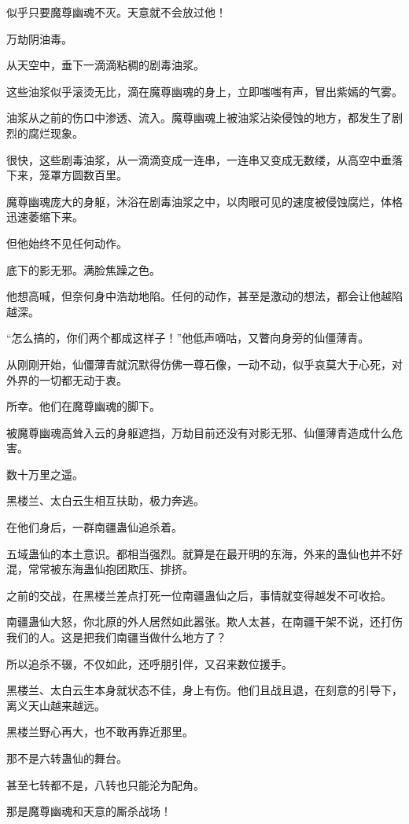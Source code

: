 \begin{this_body}
似乎只要魔尊幽魂不灭。天意就不会放过他！

万劫阴油毒。

从天空中，垂下一滴滴粘稠的剧毒油浆。

这些油浆似乎滚烫无比，滴在魔尊幽魂的身上，立即嗤嗤有声，冒出紫嫣的气雾。

油浆从之前的伤口中渗透、流入。魔尊幽魂上被油浆沾染侵蚀的地方，都发生了剧烈的腐烂现象。

很快，这些剧毒油浆，从一滴滴变成一连串，一连串又变成无数缕，从高空中垂落下来，笼罩方圆数百里。

魔尊幽魂庞大的身躯，沐浴在剧毒油浆之中，以肉眼可见的速度被侵蚀腐烂，体格迅速萎缩下来。

但他始终不见任何动作。

底下的影无邪。满脸焦躁之色。

他想高喊，但奈何身中浩劫地陷。任何的动作，甚至是激动的想法，都会让他越陷越深。

“怎么搞的，你们两个都成这样子！”他低声嘀咕，又瞥向身旁的仙僵薄青。

从刚刚开始，仙僵薄青就沉默得仿佛一尊石像，一动不动，似乎哀莫大于心死，对外界的一切都无动于衷。

所幸。他们在魔尊幽魂的脚下。

被魔尊幽魂高耸入云的身躯遮挡，万劫目前还没有对影无邪、仙僵薄青造成什么危害。

数十万里之遥。

黑楼兰、太白云生相互扶助，极力奔逃。

在他们身后，一群南疆蛊仙追杀着。

五域蛊仙的本土意识。都相当强烈。就算是在最开明的东海，外来的蛊仙也并不好混，常常被东海蛊仙抱团欺压、排挤。

之前的交战，在黑楼兰差点打死一位南疆蛊仙之后，事情就变得越发不可收拾。

南疆蛊仙大怒，你北原的外人居然如此嚣张。欺人太甚，在南疆干架不说，还打伤我们的人。这是把我们南疆当做什么地方了？

所以追杀不辍，不仅如此，还呼朋引伴，又召来数位援手。

黑楼兰、太白云生本身就状态不佳，身上有伤。他们且战且退，在刻意的引导下，离义天山越来越远。

黑楼兰野心再大，也不敢再靠近那里。

那不是六转蛊仙的舞台。

甚至七转都不是，八转也只能沦为配角。

那是魔尊幽魂和天意的厮杀战场！


\end{this_body}
